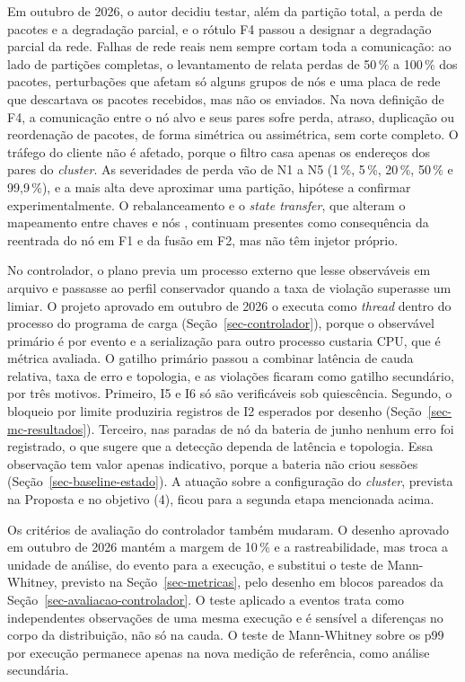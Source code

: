 Em outubro de 2026, o autor decidiu testar, além da partição total, a perda de pacotes e a degradação parcial, e o rótulo F4 passou a designar a degradação parcial da rede. Falhas de rede reais nem sempre cortam toda a comunicação: ao lado de partições completas, o levantamento de  relata perdas de 50\,\% a 100\,\% dos pacotes, perturbações que afetam só alguns grupos de nós e uma placa de rede que descartava os pacotes recebidos, mas não os enviados. Na nova definição de F4, a comunicação entre o nó alvo e seus pares sofre perda, atraso, duplicação ou reordenação de pacotes, de forma simétrica ou assimétrica, sem corte completo. O tráfego do cliente não é afetado, porque o filtro casa apenas os endereços dos pares do \emph{cluster}. As severidades de perda vão de N1 a N5 (1\,\%, 5\,\%, 20\,\%, 50\,\% e 99,9\,\%), e a mais alta deve aproximar uma partição, hipótese a confirmar experimentalmente. O rebalanceamento e o \emph{state transfer}, que alteram o mapeamento entre chaves e nós \citep{infinispan_docs_stable}, continuam presentes como consequência da reentrada do nó em F1 e da fusão em F2, mas não têm injetor próprio.

No controlador, o plano previa um processo externo que lesse observáveis em arquivo e passasse ao perfil conservador quando a taxa de violação superasse um limiar. O projeto aprovado em outubro de 2026 o executa como \emph{thread} dentro do processo do programa de carga (Seção~\ref{sec-controlador}), porque o observável primário é por evento e a serialização para outro processo custaria CPU, que é métrica avaliada. O gatilho primário passou a combinar latência de cauda relativa, taxa de erro e topologia, e as violações ficaram como gatilho secundário, por três motivos. Primeiro, I5 e I6 só são verificáveis sob quiescência. Segundo, o bloqueio por limite produziria registros de I2 esperados por desenho (Seção~\ref{sec-mc-resultados}). Terceiro, nas paradas de nó da bateria de junho nenhum erro foi registrado, o que sugere que a detecção dependa de latência e topologia. Essa observação tem valor apenas indicativo, porque a bateria não criou sessões (Seção~\ref{sec-baseline-estado}). A atuação sobre a configuração do \emph{cluster}, prevista na Proposta e no objetivo (4), ficou para a segunda etapa mencionada acima.

Os critérios de avaliação do controlador também mudaram. O desenho aprovado em outubro de 2026 mantém a margem de 10\,\% e a rastreabilidade, mas troca a unidade de análise, do evento para a execução, e substitui o teste de Mann-Whitney, previsto na Seção~\ref{sec-metricas}, pelo desenho em blocos pareados da Seção~\ref{sec-avaliacao-controlador}. O teste aplicado a eventos trata como independentes observações de uma mesma execução e é sensível a diferenças no corpo da distribuição, não só na cauda. O teste de Mann-Whitney sobre os p99 por execução permanece apenas na nova medição de referência, como análise secundária.
